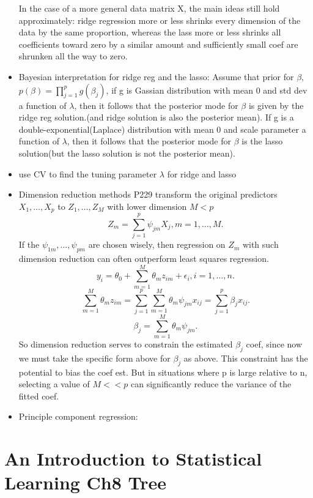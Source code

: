 \documentclass[a4paper, 12pt]{article}
\begin{document}
\begin{itemize}
	In the case of a more general data matrix X, the main ideas still hold approximately: ridge regression more or less shrinks every dimension of the data by the same proportion, whereas the lass more or less shrinks all coefficients toward zero by a similar amount and sufficiently small coef are shrunken all the way to zero.
	\item Bayesian interpretation for ridge reg and the lasso: Assume that prior for $\beta$, $p(\beta)=\prod_{j=1}^{p}g(\beta_j)$, if g is Gassian distribution with mean 0 and std dev a function of $\lambda$, then it follows that the posterior mode for $\beta$ is given by the ridge reg solution.(and ridge solution is also the posterior mean). If g is a double-exponential(Laplace) distribution with mean 0 and scale parameter a function of $\lambda$, then it follows that the posterior mode for $\beta$ is the lasso solution(but the lasso solution is not the posterior mean).
	\item use CV to find the tuning parameter $\lambda$ for ridge and lasso
	\item Dimension reduction methods P229 transform the original predictors $X_1,\ldots, X_p$ to $Z_1,\ldots,Z_M$ with lower dimension $M < p$
	\[ Z_m = \sum_{j=1}^{p}\psi_{jm}X_j, m=1,\ldots,M.
	\]
	If the $\psi_{1m},\ldots,\psi_{pm}$ are chosen wisely, then regression on $Z_m$ with such dimension reduction can often outperform least squares regression.
	\[y_i=\theta_0+\sum_{m=1}^{M}\theta_mz_{im} + \epsilon_i, i = 1,\ldots,n.
	\]
	\[\sum_{m=1}^{M}\theta_mz_{im}=\sum_{j=1}^{p}\sum_{m=1}^{M}\theta_m\psi_{jm}x_{ij}=\sum_{j=1}^{p}\beta_jx_{ij}.
	\]
	\[\beta_j=\sum_{m=1}^{M}\theta_m\psi_{jm}.
	\]
	So dimension reduction serves to constrain the estimated $\beta_j$ coef, since now we must take the specific form  above for $\beta_j$ as above. This constraint has the potential to bias the coef est. But in situations where p is large relative to n, selecting a value of $M << p$ can significantly reduce the variance of the fitted coef.
	\item Principle component regression:
\end{itemize}
	
	
\section*{An Introduction to Statistical Learning Ch8 Tree}
\end{document}

